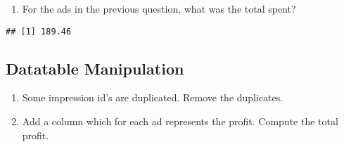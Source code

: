\documentclass[
]{article}
\newenvironment{Shaded}{\begin{snugshade}}{\end{snugshade}}
\newcommand{\DecValTok}[1]{\textcolor[rgb]{0.00,0.00,0.81}{#1}}
\newcommand{\KeywordTok}[1]{\textcolor[rgb]{0.13,0.29,0.53}{\textbf{#1}}}
\newcommand{\NormalTok}[1]{#1}
\newcommand{\OperatorTok}[1]{\textcolor[rgb]{0.81,0.36,0.00}{\textbf{#1}}}
\newcommand{\StringTok}[1]{\textcolor[rgb]{0.31,0.60,0.02}{#1}}
\providecommand{\tightlist}{%
  \setlength{\itemsep}{0pt}\setlength{\parskip}{0pt}}
\begin{document}
\begin{Shaded}
\end{Shaded}

\begin{enumerate}
\def\labelenumi{\arabic{enumi}.}
\setcounter{enumi}{8}
\tightlist
\item
  For the ads in the previous question, what was the total spent?
\end{enumerate}

\begin{Shaded}
\end{Shaded}

\begin{verbatim}
## [1] 189.46
\end{verbatim}

\hypertarget{datatable-manipulation}{%
\subsection{Datatable Manipulation}\label{datatable-manipulation}}

\begin{enumerate}
\def\labelenumi{\arabic{enumi}.}
\setcounter{enumi}{8}
\item
  Some impression id's are duplicated. Remove the duplicates.
\item
  Add a column which for each ad represents the profit. Compute the
  total profit.
\end{enumerate}

\begin{Shaded}
\end{Shaded}
\end{document}
